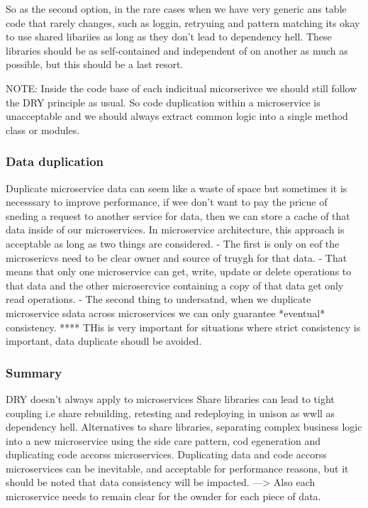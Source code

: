 \documentclass[a4paper, 11pt]{book}
\begin{document}
{    So as the second option, in the rare cases when we have very generic ans table code that rarely changes, such as loggin, retryuing and pattern matching its okay to use shared libariies as long as they don't lead to dependency hell.
    These libraries should be as self-contained and independent of on another as much as possible, but this should be a last resort.

    NOTE: Inside the code base of each indicitual micorserivce we should still follow the DRY principle as usual.
    So code duplication within a microservice is unacceptable and we should always extract common logic into a single method class or modules.

    \subsubsection{Data duplication}
    Duplicate microservice data can seem like a waste of space but sometimes it is necesssary to improve performance, if wee don't want to pay the pricue of sneding a request to another service for data, then we can store a cache of that data inside of our microservices.
    In microservice architecture, this approach is acceptable as long as two things are considered.
    - The first is only on eof the microsericvs need to be clear owner and source of truygh for that data.
    - That means that only one microservice can get, write, update or delete operations to that data and the other microsercvice containing a copy of that data get only read operations.
    - The second thing to undersatnd, when we duplicate microservice sdata across microservices we can only guarantee *eventual* consistency.
    **** THis is very important for situations where strict consistency is important, data duplicate shoudl be avoided.

    \subsubsection{Summary}
    DRY doesn't always apply to microservices
    Share libraries can lead to tight coupling i.e share rebuilding, retesting and redeploying in unison as wwll as dependency hell.
    Alternatives to share libraries, separating complex business logic into a new microservice using the side care pattern, cod egeneration and duplicating code accorss microservices.
    Duplicating data and code accorss microservices can be inevitable, and acceptable for performance reasons, but it should be noted that data consistency will be impacted.
    ---> Also each microservice needs to remain clear for the ownder for each piece of data.

}
\end{document}

